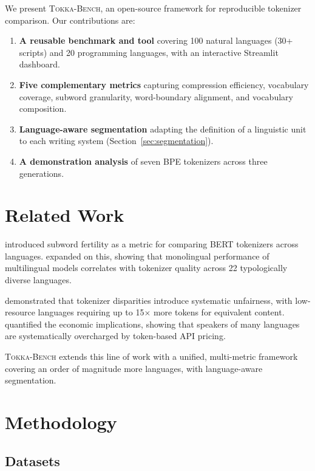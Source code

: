 \documentclass[11pt]{article}
\begin{document}
We present \textsc{Tokka-Bench}, an open-source framework for reproducible tokenizer comparison.
Our contributions are:

\begin{enumerate}
\item \textbf{A reusable benchmark and tool} covering 100 natural languages (30+ scripts) and 20 programming languages, with an interactive Streamlit dashboard.
\item \textbf{Five complementary metrics} capturing compression efficiency, vocabulary coverage, subword granularity, word-boundary alignment, and vocabulary composition.
\item \textbf{Language-aware segmentation} adapting the definition of a linguistic unit to each writing system (Section~\ref{sec:segmentation}).
\item \textbf{A demonstration analysis} of seven BPE tokenizers across three generations.
\end{enumerate}

\section{Related Work}

\citet{acs2019bert} introduced subword fertility as a metric for comparing BERT tokenizers across languages.
\citet{rust2021good} expanded on this, showing that monolingual performance of multilingual models correlates with tokenizer quality across 22 typologically diverse languages.

\citet{petrov2023language} demonstrated that tokenizer disparities introduce systematic unfairness, with low-resource languages requiring up to 15$\times$ more tokens for equivalent content.
\citet{ahia2023all} quantified the economic implications, showing that speakers of many languages are systematically overcharged by token-based API pricing.

\textsc{Tokka-Bench} extends this line of work with a unified, multi-metric framework covering an order of magnitude more languages, with language-aware segmentation.

\section{Methodology}

\subsection{Datasets}
\end{document}
